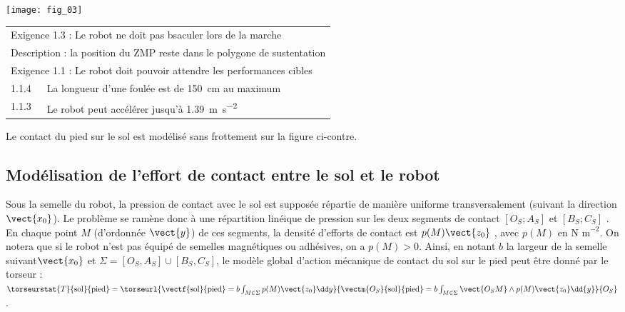 \ifprof
\else

\begin{marginfigure}
\centering
\texttt{[image: fig\_03]}
\end{marginfigure}

\begin{tabular}{ll}
\hline
\multicolumn{2}{l}{Exigence 1.3 : Le robot ne doit pas bsaculer lors de la marche} \\
\multicolumn{2}{l}{Description : la position du ZMP reste dans le polygone de sustentation} \\
\hline
\multicolumn{2}{l}{Exigence 1.1 : Le robot doit pouvoir attendre les performances cibles} \\
1.1.4 & La longueur d'une foulée est de \SI{150}{cm} au maximum \\
1.1.3 & Le robot peut accélérer jusqu'à \SI{1,39}{m.s^{-2}} \\
\hline


\hline
\end{tabular}

Le contact du pied sur le sol est modélisé sans frottement sur la figure ci-contre.



\fi

\subsection*{Modélisation de l’effort de contact entre le sol et le robot}

\ifprof
\else

Sous la semelle du robot, la pression de contact avec le sol est supposée répartie de manière uniforme
transversalement (suivant la direction $\vect{x_0}$). Le problème se ramène donc à une répartition linéique de pression
sur les deux segments de contact $[O_S ;A_S]$ et $[B_S;C_S]$ . En chaque point $M$ (d'ordonnée $\vect{y}$) de ces
segments, la densité d'efforts de contact est $p(M)\vect{z_0}$ , avec $p(M)$ en $\text{N m}^{-2}$. On notera que si le robot n'est pas équipé de semelles magnétiques ou adhésives, on a $p(M)> 0$. Ainsi, en notant $b$ la largeur de la semelle
suivant$\vect{x_0}$ et $\Sigma=[O_S ,A_S]\cup [B_S,C_S]$, le modèle global d'action mécanique de contact du sol sur le pied peut être donné par le torseur :
$
\torseurstat{T}{\text{sol}}{\text{pied}}=\torseurl{\vectf{\text{sol}}{\text{pied}}=b\int_{M\in\Sigma} p(M)\vect{z_0} \dd y }{\vectm{O_S}{\text{sol}}{\text{pied}}=b\int_{M\in\Sigma} \vect{O_S M} \wedge p(M)\vect{z_0} \dd {y}}{O_S}$.

